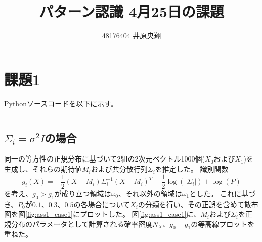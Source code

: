 \documentclass[uplatex,a4paper]{jsarticle}
\title{パターン認識 4月25日の課題}
\author{48176404 井原央翔}
\begin{document}
\maketitle
\section*{課題1}
Pythonソースコードを以下に示す。
\inputminted[linenos=true,breaklines=true,bgcolor=bg,fontsize=\footnotesize]{python}{assignment1.py}
\subsection{$\Sigma_i=\sigma^2I$の場合}
同一の等方性の正規分布に基づいて2組の2次元ベクトル1000個($X_0$および$X_1$)を生成し、それらの期待値$M_i$および共分散行列$\Sigma_i$を推定した。
識別関数
\[
g_i(X) = -\frac{1}{2} \left( X - M_i \right) \Sigma_i^{-1} \left( X - M_i \right)^T -\frac{1}{2} \log\left( \left| \Sigma_i \right| \right) + \log\left(P\right)
\]
を考え、$g_0 > g_1$が成り立つ領域は$\omega_0$、それ以外の領域は$\omega_1$とした。
これに基づき、$P_0$が$0.1$、$0.3$、$0.5$の各場合について$X_i$の分類を行い、その正誤を含めて散布図を図\ref{fig:ass1_case1}にプロットした。
図\ref{fig:ass1_case1}に、$M_i$および$\Sigma_i$を正規分布のパラメータとして計算される確率密度$N_X$、$g_0-g_1$の等高線プロットを重ねた。
\end{document}
